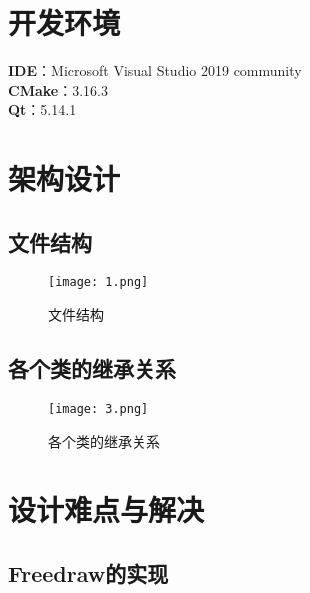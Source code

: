 \documentclass[14pt]{scrartcl} %
\begin{document}

\section{开发环境}

\textbf{IDE}：Microsoft Visual Studio 2019 community\\
\textbf{CMake}：3.16.3\\
\textbf{Qt}：5.14.1


\pagebreak
\section{架构设计}

\subsection{文件结构}

\begin{figure}[h] %
	\centering
	\texttt{[image: 1.png]} %
	\caption{文件结构}
\end{figure}

\pagebreak
\subsection{各个类的继承关系}

\begin{figure}[h] %
	\centering
	\texttt{[image: 3.png]} %
	\caption{各个类的继承关系}
\end{figure}

\pagebreak
\section{设计难点与解决}

\subsection{Freedraw的实现}
\end{document}
